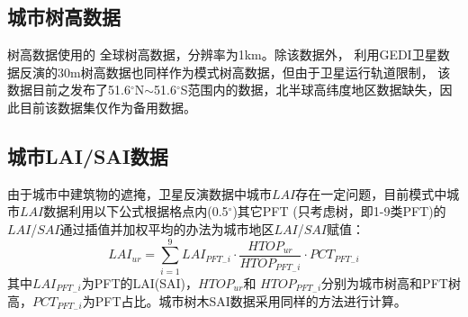 \subsection{城市树高数据}\label{城市树高数据}
树高数据使用的 \citet{simard2011mapping} 全球树高数据，分辨率为1km。除该数据外， \citep{potapov2021mapping} 
利用GEDI卫星数据反演的30m树高数据也同样作为模式树高数据，但由于卫星运行轨道限制，
该数据目前之发布了51.6$^\circ$N$\sim$51.6$^\circ$S范围内的数据，北半球高纬度地区数据缺失，因此目前该数据集仅作为备用数据。
\subsection{城市LAI/SAI数据}\label{城市LAISAI数据}
由于城市中建筑物的遮掩，卫星反演数据中城市$LAI$存在一定问题，目前模式中城市$LAI$数据利用以下公式根据格点内(0.5$^\circ$)其它PFT
 (只考虑树，即1-9类PFT)的$LAI$/$SAI$通过插值并加权平均的办法为城市地区$LAI$/$SAI$赋值：
\begin{equation}
L A I_{u r}=\sum_{i=1}^{9} L A I_{P F T_{-} i} \cdot \frac{H T O P_{u r}}{H T O P_{P F T_{-} i}} \cdot P C T_{P F T_{-} i}
\end{equation}
其中$LAI_{PFT_{-}i}$为PFT的LAI(SAI)，$HTOP_{ur}$和 $HTOP_{PFT_{-} i}$分别为城市树高和PFT树高，$PCT_{PFT_{-} i}$为PFT占比。城市树木SAI数据采用同样的方法进行计算。





